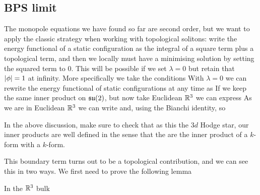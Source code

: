 \documentclass{article}
\begin{document}
\subsection{BPS limit}
The monopole equations we have found so far are second order, but we want to apply the classic strategy when working with topological solitons: write the energy functional of a static configuration as the integral of a square term plus a topological term, and then we locally must have a minimising solution by setting the squared term to 0. This will be possible if we set $\lambda=0$ but retain that $\left\lvert \phi \right\rvert=1$ at infinity. More specifically we take the conditions 
With $\lambda=0$ we can rewrite the energy functional of static configurations at any time as 
If we keep the same inner product on $\mathfrak{su}(2)$, but now take Euclidean $\mathbb{R}^3$ we can express
As we are in Euclidean $\mathbb{R}^3$ we can write 
and, using the Bianchi identity,
so 
\begin{remark}
	In the above discussion, make sure to check that as this the $3d$ Hodge star, our inner products are well defined in the sense that the are the inner product of a $k$-form with a $k$-form. 
\end{remark}
This boundary term turns out to be a topological contribution, and we can see this in two ways. We first need to prove the following lemma
\begin{lemma}
	In the $\mathbb{R}^3$ bulk 
\end{lemma}
\end{document}
